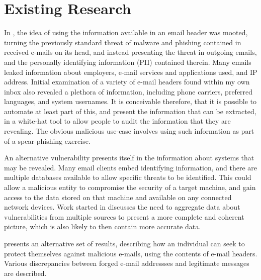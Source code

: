 \chapter{Existing Research}
In \cite{nurse2015investigating}, the idea of using the information available in an email header was mooted, turning the previously standard threat of malware and phishing contained in received e-mails on its head, and instead presenting the threat in outgoing emails, and the personally identifying information (PII) contained therein.  Many emails leaked information about employers, e-mail services and applications used, and IP address.  Initial examination of a variety of e-mail headers found within my own inbox also revealed a plethora of information, including phone carriers, preferred languages, and system usernames.  It is conceivable therefore, that it is possible to automate at least part of this, and present the information that can be extracted, in a white-hat tool to allow people to audit the information that they are revealing.  The obvious malicious use-case involves using such information as part of a spear-phishing exercise.

An alternative vulnerability presents itself in the information about systems that may be revealed.  Many email clients embed identifying information, and there are multiple databases available to allow specific threats to be identified.  This could allow a malicious entity to compromise the security of a target machine, and gain access to the data stored on that machine and available on any connected network devices.  Work started in \cite{joshi2013extracting} discusses the need to aggregate data about vulnerabilities from multiple sources to present a more complete and coherent picture, which is also likely to then contain more accurate data.

\cite{Al-zarouni_tracinge-mail} presents an alternative set of results, describing how an individual can seek to protect themselves against malicious e-mails, using the contents of e-mail headers.  Various discrepancies between forged e-mail addressses and legitimate messages are described.